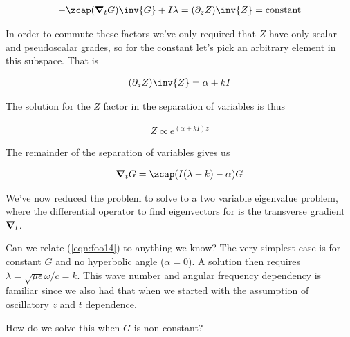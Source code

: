 \begin{align}\label{eqn:foo11}
-\zcap (\spacegrad_t G) \inv{G} + I \lambda  = (\partial_z Z)\inv{Z} = \text{constant}
\end{align}

In order to commute these factors we've only required that $Z$ have only scalar and pseudoscalar grades, so for the constant let's pick an arbitrary element in this subspace.  That is

\begin{align}\label{eqn:foo12}
(\partial_z Z)\inv{Z} = \alpha + k I
\end{align}

The solution for the $Z$ factor in the separation of variables is thus

\begin{align}\label{eqn:foo13}
Z \propto e^{(\alpha + k I)z}
\end{align}

The remainder of the separation of variables gives us

\begin{align}\label{eqn:foo14}
\spacegrad_t G = \zcap (I (\lambda -k) -\alpha) G
\end{align}

We've now reduced the problem to solve to a two variable eigenvalue problem, where the differential operator to find eigenvectors for is the transverse gradient $\boldsymbol{\nabla}_t$.

Can we relate (\ref{eqn:foo14}) to anything we know?  The very simplest case is for constant $G$ and no hyperbolic angle ($\alpha=0$).  A solution then requires $\lambda = \sqrt{\mu\epsilon} \omega/c = k$.  This wave number and angular frequency dependency is familiar since we also had that when we started with the assumption of oscillatory $z$ and $t$ dependence.

How do we solve this when $G$ is non constant?

\EndArticle
